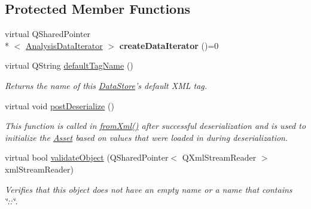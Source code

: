 \subsection*{Protected Member Functions}
\begin{DoxyCompactItemize}
\item 
\hypertarget{class_picto_1_1_analysis_trigger_ad7d0136e8e450f86a70200c3b28afa9f}{virtual Q\-Shared\-Pointer\\*
$<$ \hyperlink{class_picto_1_1_analysis_data_iterator}{Analysis\-Data\-Iterator} $>$ {\bfseries create\-Data\-Iterator} ()=0}\label{class_picto_1_1_analysis_trigger_ad7d0136e8e450f86a70200c3b28afa9f}

\item 
virtual Q\-String \hyperlink{class_picto_1_1_analysis_trigger_a28d5915dd8abd7ae03185111b529025d}{default\-Tag\-Name} ()
\begin{DoxyCompactList}\small\item\em Returns the name of this \hyperlink{class_picto_1_1_data_store}{Data\-Store}'s default X\-M\-L tag. \end{DoxyCompactList}\item 
virtual void \hyperlink{class_picto_1_1_analysis_trigger_a05e5bb8c08c529a59bf996497ac6bdf6}{post\-Deserialize} ()
\begin{DoxyCompactList}\small\item\em This function is called in \hyperlink{class_picto_1_1_asset_a8bed4da09ecb1c07ce0dab313a9aba67}{from\-Xml()} after successful deserialization and is used to initialize the \hyperlink{class_picto_1_1_asset}{Asset} based on values that were loaded in during deserialization. \end{DoxyCompactList}\item 
\hypertarget{class_picto_1_1_analysis_trigger_ad945dba1a9aad0ab0dc13913e1698810}{virtual bool \hyperlink{class_picto_1_1_analysis_trigger_ad945dba1a9aad0ab0dc13913e1698810}{validate\-Object} (Q\-Shared\-Pointer$<$ Q\-Xml\-Stream\-Reader $>$ xml\-Stream\-Reader)}\label{class_picto_1_1_analysis_trigger_ad945dba1a9aad0ab0dc13913e1698810}

\begin{DoxyCompactList}\small\item\em Verifies that this object does not have an empty name or a name that contains \char`\"{}\-::\char`\"{}. \end{DoxyCompactList}\end{DoxyCompactItemize}

